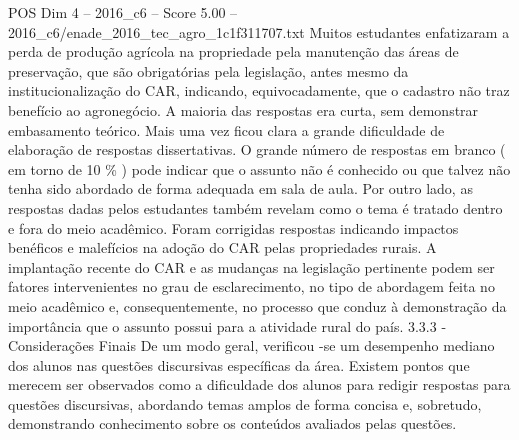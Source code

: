 \begin{textsample}{POS Dim 4 – 2016\_c6 – Score 5.00 – 2016\_c6/enade\_2016\_tec\_agro\_1c1f311707.txt}
Muitos estudantes enfatizaram a perda de produção agrícola na propriedade pela manutenção das áreas de preservação, que são obrigatórias pela legislação, antes mesmo da institucionalização do CAR, indicando, equivocadamente, que o cadastro não traz benefício ao agronegócio.
A maioria das respostas era curta, sem demonstrar embasamento teórico.
Mais uma vez ficou clara a grande dificuldade de elaboração de respostas dissertativas.
O grande número de respostas em branco ( em torno de 10 \% ) pode indicar que o assunto não é conhecido ou que talvez não tenha sido abordado de forma adequada em sala de aula.
Por outro lado, as respostas dadas pelos estudantes também revelam como o tema é tratado dentro e fora do meio acadêmico.
Foram corrigidas respostas indicando impactos benéficos e malefícios na adoção do CAR pelas propriedades rurais.
A implantação recente do CAR e as mudanças na legislação pertinente podem ser fatores intervenientes no grau de esclarecimento, no tipo de abordagem feita no meio acadêmico e, consequentemente, no processo que conduz à demonstração da importância que o assunto possui para a atividade rural do país. 3.3.3 - Considerações Finais De um modo geral, verificou -se um desempenho mediano dos alunos nas questões discursivas específicas da área.
Existem pontos que merecem ser observados como a dificuldade dos alunos para redigir respostas para questões discursivas, abordando temas amplos de forma concisa e, sobretudo, demonstrando conhecimento sobre os conteúdos avaliados pelas questões.

\end{textsample}
